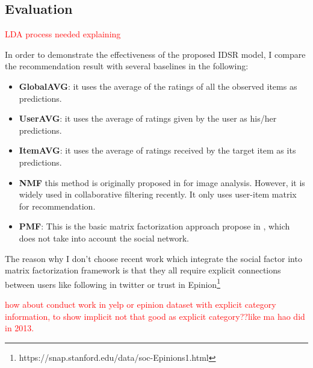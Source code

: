 \subsection{Evaluation}

\textcolor{red}{LDA process needed explaining}

In order to demonstrate the effectiveness of the proposed IDSR model, I compare the recommendation result with several baselines in the following:
\begin{itemize}
	\item \textbf{GlobalAVG}: it uses the average of the ratings of all the observed items as predictions.
	\item \textbf{UserAVG}: it uses the average of ratings given by the user as his/her predictions.
	\item \textbf{ItemAVG}: it uses the average of ratings received by the target item as its predictions.
	\item \textbf{NMF} this method is originally proposed in \cite{lee1999learning} for image analysis. However, it is widely used in collaborative filtering recently. It only uses user-item matrix for recommendation.
	\item \textbf{PMF}: This is the basic matrix factorization approach propose in \cite{mnih2007probabilistic} , which does not take into account the social network.
\end{itemize}

The reason why I don't choose recent work which integrate the social factor into matrix factorization framework \cite{jamali2010matrix}\cite{ma2008sorec}\cite{ma2009learningTrust}\cite{yang2012circle}\cite{yang2013social} is that they all require explicit connections between users like following in twitter or trust in Epinion\footnote{https://snap.stanford.edu/data/soc-Epinions1.html}

\textcolor{red}{how about conduct work in yelp or epinion dataset with explicit category information, to show implicit not that good as explicit category??like ma hao did in 2013.}

